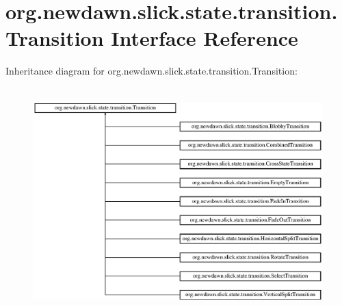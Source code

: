 \hypertarget{interfaceorg_1_1newdawn_1_1slick_1_1state_1_1transition_1_1_transition}{}\section{org.\+newdawn.\+slick.\+state.\+transition.\+Transition Interface Reference}
\label{interfaceorg_1_1newdawn_1_1slick_1_1state_1_1transition_1_1_transition}
Inheritance diagram for org.\+newdawn.\+slick.\+state.\+transition.\+Transition\+:\begin{figure}[H]
\begin{center}
\leavevmode
\includegraphics[height=8.800000cm]{interfaceorg_1_1newdawn_1_1slick_1_1state_1_1transition_1_1_transition}
\end{center}
\end{figure}
